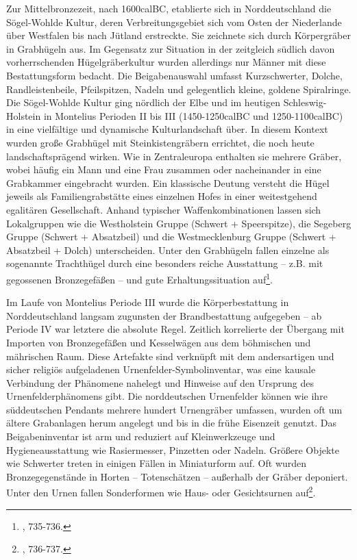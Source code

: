 \documentclass[openany,twoside,twocolumn]{book}
\let\rmarkdownfootnote\footnote%
\def\footnote{\protect\rmarkdownfootnote}
\begin{document}
Zur Mittelbronzezeit, nach 1600calBC, etablierte sich in Norddeutschland die Sögel-Wohlde Kultur, deren Verbreitungsgebiet sich vom Osten der Niederlande über Westfalen bis nach Jütland erstreckte. Sie zeichnete sich durch Körpergräber in Grabhügeln aus. Im Gegensatz zur Situation in der zeitgleich südlich davon vorherrschenden Hügelgräberkultur wurden allerdings nur Männer mit diese Bestattungsform bedacht. Die Beigabenauswahl umfasst Kurzschwerter, Dolche, Randleistenbeile, Pfeilspitzen, Nadeln und gelegentlich kleine, goldene Spiralringe. Die Sögel-Wohlde Kultur ging nördlich der Elbe und im heutigen Schleswig-Holstein in Montelius Perioden II bis III (1450-1250calBC und 1250-1100calBC) in eine vielfältige und dynamische Kulturlandschaft über. In diesem Kontext wurden große Grabhügel mit Steinkistengräbern errichtet, die noch heute landschaftsprägend wirken. Wie in Zentraleuropa enthalten sie mehrere Gräber, wobei häufig ein Mann und eine Frau zusammen oder nacheinander in eine Grabkammer eingebracht wurden. Ein klassische Deutung versteht die Hügel jeweils als Familiengrabstätte eines einzelnen Hofes in einer weitestgehend egalitären Gesellschaft. Anhand typischer Waffenkombinationen lassen sich Lokalgruppen wie die Westholstein Gruppe (Schwert + Speerspitze), die Segeberg Gruppe (Schwert + Absatzbeil) und die Westmecklenburg Gruppe (Schwert + Absatzbeil + Dolch) unterscheiden. Unter den Grabhügeln fallen einzelne als sogenannte Trachthügel durch eine besonders reiche Ausstattung -- z.B. mit gegossenen Bronzegefäßen -- und gute Erhaltungssituation auf\footnote{\textcite{jockenhovel_germany_2013}, 735-736.}.

Im Laufe von Montelius Periode III wurde die Körperbestattung in Norddeutschland langsam zugunsten der Brandbestattung aufgegeben -- ab Periode IV war letztere die absolute Regel. Zeitlich korrelierte der Übergang mit Importen von Bronzegefäßen und Kesselwägen aus dem böhmischen und mährischen Raum. Diese Artefakte sind verknüpft mit dem andersartigen und sicher religiös aufgeladenen Urnenfelder-Symbolinventar, was eine kausale Verbindung der Phänomene nahelegt und Hinweise auf den Ursprung des Urnenfelderphänomens gibt. Die norddeutschen Urnenfelder können wie ihre süddeutschen Pendants mehrere hundert Urnengräber umfassen, wurden oft um ältere Grabanlagen herum angelegt und bis in die frühe Eisenzeit genutzt. Das Beigabeninventar ist arm und reduziert auf Kleinwerkzeuge und Hygieneausstattung wie Rasiermesser, Pinzetten oder Nadeln. Größere Objekte wie Schwerter treten in einigen Fällen in Miniaturform auf. Oft wurden Bronzegegenstände in Horten -- Totenschätzen -- außerhalb der Gräber deponiert. Unter den Urnen fallen Sonderformen wie Haus- oder Gesichtsurnen auf\footnote{\textcite{jockenhovel_germany_2013}, 736-737.}.
\end{document}

